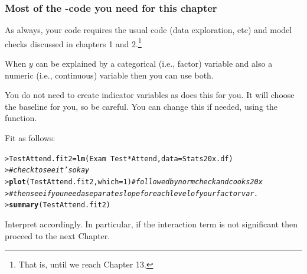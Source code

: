 \documentclass{beamer}\usepackage[]{graphicx}\usepackage[]{xcolor}
\makeatletter
\newcommand{\hlnum}[1]{\textcolor[rgb]{0.686,0.059,0.569}{#1}}%
\newcommand{\hlcom}[1]{\textcolor[rgb]{0.678,0.584,0.686}{\textit{#1}}}%
\newcommand{\hlopt}[1]{\textcolor[rgb]{0,0,0}{#1}}%
\newcommand{\hlstd}[1]{\textcolor[rgb]{0.345,0.345,0.345}{#1}}%
\newcommand{\hlkwb}[1]{\textcolor[rgb]{0.69,0.353,0.396}{#1}}%
\newcommand{\hlkwc}[1]{\textcolor[rgb]{0.333,0.667,0.333}{#1}}%
\newcommand{\hlkwd}[1]{\textcolor[rgb]{0.737,0.353,0.396}{\textbf{#1}}}%
\newenvironment{kframe}{%
 \def\at@end@of@kframe{}%
 \ifinner\ifhmode%
  \def\at@end@of@kframe{\end{minipage}}%
  \begin{minipage}{\columnwidth}%
 \fi\fi%
 \def\FrameCommand##1{\hskip\@totalleftmargin \hskip-\fboxsep
 \colorbox{shadecolor}{##1}\hskip-\fboxsep
     \hskip-\linewidth \hskip-\@totalleftmargin \hskip\columnwidth}%
 \MakeFramed {\advance\hsize-\width
   \@totalleftmargin\z@ \linewidth\hsize
   \@setminipage}}%
 {\par\unskip\endMakeFramed%
 \at@end@of@kframe}
\newenvironment{knitrout}{}{} %
\makeatother
\begin{document}
\begin{frame}[fragile]
\frametitle{Most of the -code you need for this chapter}

As always, your code requires the usual code (data exploration, etc) and model checks discussed in chapters 1 and 2.\footnote{That is, until we reach Chapter 13.}

\medskip
When $y$ can be explained by a categorical (i.e., factor) variable and also a numeric (i.e., continuous) variable then you can use both.
\medskip

You do not need to create indicator variables as  does this for you. It will choose the baseline for you, so be careful.  You can change this if needed, using the  function. 
\medskip


Fit as follows:

\begin{knitrout}\scriptsize
{}\color{fgcolor}\begin{kframe}
\begin{alltt}
\hlstd{> }\hlstd{TestAttend.fit2}\hlkwb{=}\hlkwd{lm}\hlstd{(Exam} \hlopt{~}\hlstd{Test}\hlopt{*}\hlstd{Attend,} \hlkwc{data}\hlstd{=Stats20x.df)}
\hlstd{> }\hlcom{#check to see it's okay}
\hlstd{> }\hlkwd{plot}\hlstd{(TestAttend.fit2,} \hlkwc{which}\hlstd{=}\hlnum{1}\hlstd{)} \hlcom{#followed by normcheck and cooks20x}
\hlstd{> }\hlcom{# then see if you need a separate slope for each level of your factor var.}
\hlstd{> }\hlkwd{summary}\hlstd{(TestAttend.fit2)}
\end{alltt}
\end{kframe}
\end{knitrout}

Interpret accordingly. In particular, if the interaction term is not significant then proceed to the next Chapter.

\end{frame}
\end{document}
